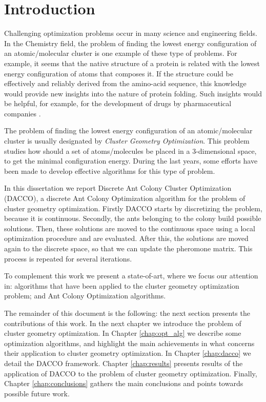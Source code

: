 \chapter{Introduction}

Challenging optimization problems occur in many science and engineering fields. In the Chemistry field, the problem of finding the lowest energy configuration of an atomic/molecular cluster is one example of these type of problems. For example, it seems that the native structure of a protein is related with the lowest energy configuration of atoms that composes it. If the structure could be effectively and reliably derived from the amino-acid sequence, this knowledge would provide new insights into the nature of protein folding. Such insights would be helpful, for example, for the development of drugs by pharmaceutical companies \cite{wales97}.

The problem of finding the lowest energy configuration of an atomic/molecular cluster is usually designated by \emph{Cluster Geometry Optimization}. This problem studies how should a set of atoms/molecules be placed in a 3-dimensional space, to get the minimal configuration energy. During the last years, some efforts have been made to develop effective algorithms for this type of problem.

In this dissertation we report Discrete Ant Colony Cluster Optimization (DACCO), a discrete Ant Colony Optimization algorithm for the problem of cluster geometry optimization. Firstly DACCO starts by discretizing the problem, because it is continuous. Secondly, the ants belonging to the colony build possible solutions. Then, these solutions are moved to the continuous space using a local optimization procedure and are evaluated. After this, the solutions are moved again to the discrete space, so that we can update the pheromone matrix. This process is repeated for several iterations.

To complement this work we present a state-of-art, where we focus our attention in: algorithms that have been applied to the cluster geometry optimization problem; and Ant Colony Optimization algorithms.

The remainder of this document is the following: the next section presents the contributions of this work. In the next chapter we introduce the problem of cluster geometry optimization. In Chapter \ref{chap:opt_alg} we describe some optimization algorithms, and highlight the main achievements in what concerns their application to cluster geometry optimization. In Chapter \ref{chap:dacco} we detail the DACCO framework. Chapter \ref{chap:results} presents results of the application of DACCO to the problem of cluster geometry optimization. Finally, Chapter \ref{chap:conclusions} gathers the main conclusions and points towards possible future work.



